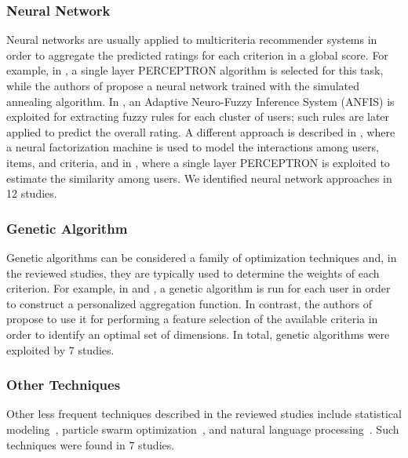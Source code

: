 \subsubsection{Neural Network}

Neural networks are usually applied to multicriteria recommender systems in order to aggregate the predicted ratings for each criterion in a global score. For example, in , a single layer PERCEPTRON algorithm is selected for this task, while the authors of  propose a neural network trained with the simulated annealing algorithm. In , an Adaptive Neuro-Fuzzy Inference System (ANFIS) is exploited for extracting fuzzy rules for each cluster of users; such rules are later applied to predict the overall rating. A different approach is described in , where a neural factorization machine is used to model the interactions among users, items, and criteria, and in , where a single layer PERCEPTRON is exploited to estimate the similarity among users. We identified neural network approaches in 12 studies.

\subsubsection{Genetic Algorithm}

Genetic algorithms can be considered a family of optimization techniques and, in the reviewed studies, they are typically used to determine the weights of each criterion. For example, in  and , a genetic algorithm is run for each user in order to construct a personalized aggregation function. In contrast, the authors of  propose to use it for performing a feature selection of the available criteria in order to identify an optimal set of dimensions. In total, genetic algorithms were exploited by 7 studies.

\subsubsection{Other Techniques}

Other less frequent techniques described in the reviewed studies include statistical modeling~, particle swarm optimization~, and natural language processing~. Such techniques were found in 7 studies.

